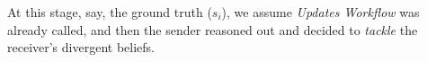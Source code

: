 \documentclass[letterpaper]{article} %
\begin{document}
%
% 
% 
% 
At this stage, say, the ground truth ($s_i$), we assume \textit{Updates Workflow} was already called, and then the sender reasoned out and decided to \textit{tackle} the receiver's divergent beliefs. 
% 
% 
\end{document}
